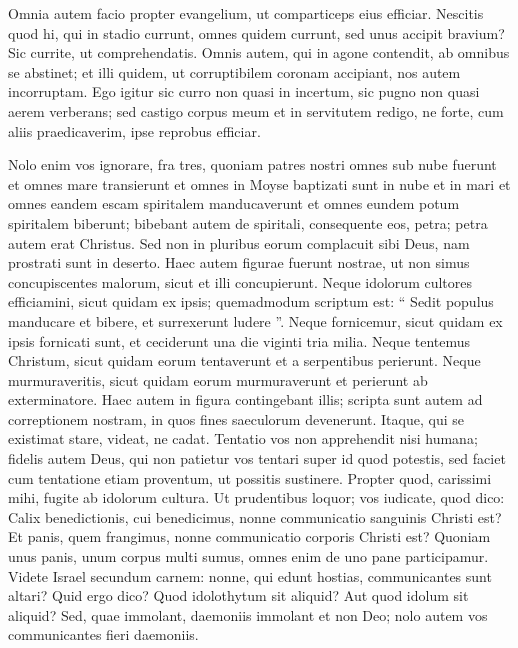 \begin{biblechapter}
\begin{biblechapter}
\begin{biblechapter}
\begin{biblechapter}
\begin{biblechapter}
\begin{biblechapter}
\begin{biblechapter}
\begin{biblechapter}
\begin{biblechapter}
\verse Omnia autem facio propter evangelium, ut comparticeps eius efficiar.
 \verse Nescitis quod hi, qui in stadio currunt, omnes quidem currunt, sed unus accipit bravium? Sic currite, ut comprehendatis. 
\verse Omnis autem, qui in agone contendit, ab omnibus se abstinet; et illi quidem, ut corruptibilem coronam accipiant, nos autem incorruptam. 
\verse Ego igitur sic curro non quasi in incertum, sic pugno non quasi aerem verberans; 
\verse sed castigo corpus meum et in servitutem redigo, ne forte, cum aliis praedicaverim, ipse reprobus efficiar.
 
\begin{biblechapter}
\verse Nolo enim vos ignorare, fra tres, quoniam patres nostri omnes sub nube fuerunt et omnes mare transierunt 
\verse et omnes in Moyse baptizati sunt in nube et in mari 
\verse et omnes eandem escam spiritalem manducaverunt 
\verse et omnes eundem potum spiritalem biberunt; bibebant autem de spiritali, consequente eos, petra; petra autem erat Christus. 
\verse Sed non in pluribus eorum complacuit sibi Deus, nam prostrati sunt in deserto.
 \verse Haec autem figurae fuerunt nostrae, ut non simus concupiscentes malorum, sicut et illi concupierunt. 
\verse Neque idolorum cultores efficiamini, sicut quidam ex ipsis; quemadmodum scriptum est: “ Sedit populus manducare et bibere, et surrexerunt ludere ”. 
\verse Neque fornicemur, sicut quidam ex ipsis fornicati sunt, et ceciderunt una die viginti tria milia. 
\verse Neque tentemus Christum, sicut quidam eorum tentaverunt et a serpentibus perierunt. 
\verse Neque murmuraveritis, sicut quidam eorum murmuraverunt et perierunt ab exterminatore. 
 \verse Haec autem in figura contingebant illis; scripta sunt autem ad correptionem nostram, in quos fines saeculorum devenerunt. 
\verse Itaque, qui se existimat stare, videat, ne cadat. 
\verse Tentatio vos non apprehendit nisi humana; fidelis autem Deus, qui non patietur vos tentari super id quod potestis, sed faciet cum tentatione etiam proventum, ut possitis sustinere.
 \verse Propter quod, carissimi mihi, fugite ab idolorum cultura. 
\verse Ut prudentibus loquor; vos iudicate, quod dico: 
\verse Calix benedictionis, cui benedicimus, nonne communicatio sanguinis Christi est? Et panis, quem frangimus, nonne communicatio corporis Christi est? 
\verse Quoniam unus panis, unum corpus multi sumus, omnes enim de uno pane participamur. 
\verse Videte Israel secundum carnem: nonne, qui edunt hostias, communicantes sunt altari?
 \verse Quid ergo dico? Quod idolothytum sit aliquid? Aut quod idolum sit aliquid? 
 \verse Sed, quae immolant, daemoniis immolant et non Deo; nolo autem vos communicantes fieri daemoniis. 

\end{biblechapter}
\end{biblechapter}
\end{biblechapter}
\end{biblechapter}
\end{biblechapter}
\end{biblechapter}
\end{biblechapter}
\end{biblechapter}
\end{biblechapter}
\end{biblechapter}
